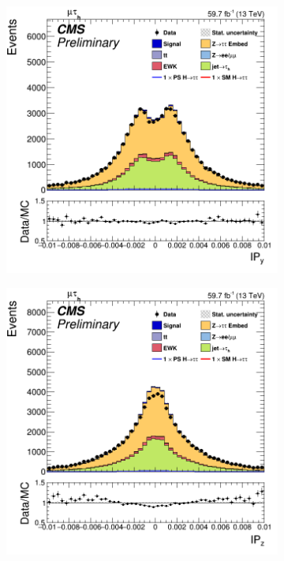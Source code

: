 \begin{figure}[!ht]
\begin{subfigure}[b]{0.33\linewidth}
    \caption{} 
    \vspace{0.5ex}
  \end{subfigure}%
  \begin{subfigure}[b]{0.33\linewidth}
    \centering
    \includegraphics[width=\linewidth]{Chapitre7/Images/MuonIPy.png} 
    \caption{} 
    \vspace{0.5ex}
  \end{subfigure} 
    \begin{subfigure}[b]{0.33\linewidth}
    \centering
    \includegraphics[width=\linewidth]{Chapitre7/Images/MuonIPz.png} 

\end{subfigure}
\end{figure}
